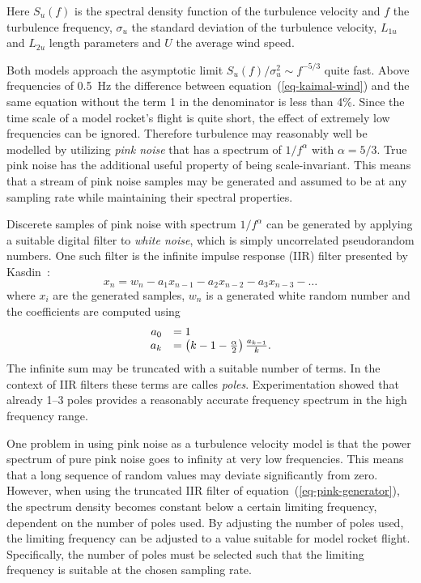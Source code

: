 Here $S_u(f)$ is the spectral density function of the turbulence
velocity and $f$ the turbulence frequency, $\sigma_u$ the standard
deviation of the turbulence velocity, $L_{1u}$ and $L_{2u}$ length
parameters and $U$ the average wind speed.

Both models approach the asymptotic limit 
$S_u(f)/\sigma_u^2 \sim f^{-5/3}$ quite fast.  Above frequencies of
0.5~Hz the difference between equation~(\ref{eq-kaimal-wind}) and the
same equation without the term 1 in the denominator is less than 4\%.
Since the time scale of a model rocket's flight is quite short, the
effect of extremely low frequencies can be ignored.  Therefore
turbulence may reasonably well be modelled by utilizing 
{\it pink noise} that has a spectrum of $1/f^\alpha$ with $\alpha=5/3$.
True pink noise has the additional useful property of being
scale-invariant.  This means that a stream of pink noise samples may
be generated and assumed to be at any sampling rate while maintaining
their spectral properties.

Discerete samples of pink noise with spectrum $1/f^\alpha$ can be
generated by applying a suitable digital filter to {\it white noise},
which is simply uncorrelated pseudorandom numbers.  One such filter is
the infinite impulse response (IIR) filter presented by
Kasdin~\cite{pink-filter}:
%
\begin{equation}
x_n = w_n - a_1 x_{n-1} - a_2 x_{n-2} - a_3 x_{n-3} - \ldots
\label{eq-pink-generator}
\end{equation}
%
where $x_i$ are the generated samples, $w_n$ is a generated white
random number and the coefficients are computed using
%
\begin{equation}
\begin{array}{rl}
a_0 & = 1 \\
a_k & = \del{k-1-\frac{\alpha}{2}} \frac{a_{k-1}}{k}.
\end{array}
\label{eq-pink-coefficients}
\end{equation}
%
The infinite sum may be truncated with a suitable number of terms.
In the context of IIR filters these terms are calles {\it poles}.
Experimentation showed that already 1--3 poles provides a reasonably
accurate frequency spectrum in the high frequency range.

One problem in using pink noise as a turbulence velocity
model is that the power spectrum of pure pink noise goes to
infinity at very low frequencies.  This means that a long sequence
of random values may deviate significantly from zero.  However, when
using the truncated IIR filter of equation~(\ref{eq-pink-generator}),
the spectrum density becomes constant below a certain limiting
frequency, dependent on the number of poles used.  By adjusting the
number of poles used, the limiting frequency can be adjusted to a value
suitable for model rocket flight.  Specifically, the number of poles
must be selected such that the limiting frequency is suitable at the
chosen sampling rate.  

